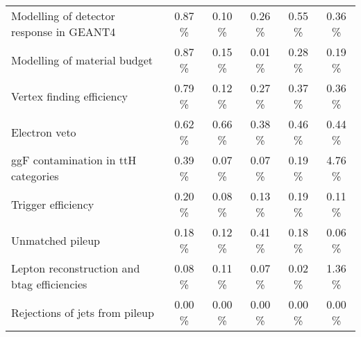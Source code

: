 \begin{tabular} { |l |  c |  c |  c |  c |  c |  }
   Modelling of detector response in GEANT4  &  0.87 \% &  0.10 \% &  0.26 \% &  0.55 \% &  0.36 \% \\
   Modelling of material budget  &  0.87 \% &  0.15 \% &  0.01 \% &  0.28 \% &  0.19 \% \\
   Vertex finding efficiency  &  0.79 \% &  0.12 \% &  0.27 \% &  0.37 \% &  0.36 \% \\
   Electron veto  &  0.62 \% &  0.66 \% &  0.38 \% &  0.46 \% &  0.44 \% \\
   ggF contamination in ttH categories  &  0.39 \% &  0.07 \% &  0.07 \% &  0.19 \% &  4.76 \% \\
   Trigger efficiency  &  0.20 \% &  0.08 \% &  0.13 \% &  0.19 \% &  0.11 \% \\
   Unmatched pileup  &  0.18 \% &  0.12 \% &  0.41 \% &  0.18 \% &  0.06 \% \\
   Lepton reconstruction and btag efficiencies  &  0.08 \% &  0.11 \% &  0.07 \% &  0.02 \% &  1.36 \% \\
   Rejections of jets from pileup  &  0.00 \% &  0.00 \% &  0.00 \% &  0.00 \% &  0.00 \% \\
   \hline
   \end{tabular}

